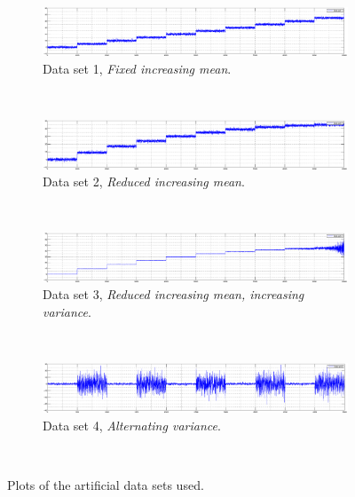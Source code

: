 \begin{figure}
  \centering
  \begin{subfigure}[b]{1\textwidth}
   \includegraphics[width=1\textwidth]{./Figures/chapter5/set_1_data.eps}
   \caption[Fixed increasing mean]{Data set 1, \emph{Fixed increasing mean}.}
   \label{fig:camci_fixed_increasing_mean}
  \end{subfigure} \\

  \begin{subfigure}[b]{1\textwidth}
   \includegraphics[width=1\textwidth]{./Figures/chapter5/set_2_data.eps}
   \caption[Reduced increasing mean]{Data set 2, \emph{Reduced increasing mean}.}
   \label{fig:takeuchi_reduced_increasing_mean}
  \end{subfigure} \\

  \begin{subfigure}[b]{1\textwidth}
    \includegraphics[width=1\textwidth]{./Figures/chapter5/set_3_data.eps}
    \caption[Reduced increasing mean, increasing variance]{Data set 3, \emph{Reduced increasing mean, increasing variance}.}
    \label{fig:camci_reduced_increasing_mean_increasing_variance}
   \end{subfigure} \\

  \begin{subfigure}[b]{1\textwidth}
   \includegraphics[width=1\textwidth]{./Figures/chapter5/set_4_data.eps}
   \caption[Alternating variance]{Data set 4, \emph{Alternating variance}.}
   \label{fig:camci_takeuchi_alternating_variance}
  \end{subfigure} \\

  \caption[Artificial data sets]{Plots of the artificial data sets used.}
  \label{fig:plots_artificial_data_sets}
\end{figure}



